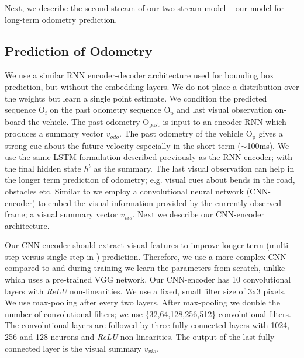 \iffalse
Thus, our predictive distribution factorizes over time-steps and the predictive distribution at time $t+n$ is conditioned upon the summary vector $v_{bbox}$ (thus $\text{B}_{\text{past}}$), the predicted odometry and the distribution at the previous time-step. \mario{you always talk about ``can'' in the previous paragraph. say what you do - otherwise it is perceived as optional}
\fi

Next, we describe the second stream of our two-stream model -- our model for long-term odometry prediction.

\subsection{Prediction of Odometry}\label{sec:odometry}
We use a similar RNN encoder-decoder architecture used for bounding box prediction, but without the embedding layers. We do not place a distribution over the weights but learn a single point estimate. We condition the predicted sequence $\text{O}_{\text{f}}$ on the past odometry sequence $\text{O}_{\text{p}}$ and last visual observation on-board the vehicle. The past odometry $\text{O}_{\text{past}}$ is input to an encoder RNN which produces a summary vector $v_{odo}$. The past odometry of the vehicle $\text{O}_{\text{p}}$ gives a strong cue about the future velocity especially in the short term ($\sim$100ms). We use the same LSTM formulation described previously as the RNN encoder; with the final hidden state $h^{t}$ as the summary. The last visual observation can help in the longer term prediction of odometry; e.g. visual cues about bends in the road, obstacles etc. Similar to \cite{xu2016end,bojarski2016end} we employ a convolutional neural network (CNN-encoder) to embed the visual information provided by the currently observed frame; a visual summary vector $v_{vis}$. Next we describe our CNN-encoder architecture.

Our CNN-encoder should extract visual features to improve longer-term (multi-step versus single-step in \cite{xu2016end,bojarski2016end}) prediction. Therefore, we use a more complex CNN compared to \cite{bojarski2016end} and during training we learn the parameters from scratch, unlike \cite{xu2016end} which uses a pre-trained VGG network. Our CNN-encoder has 10 convolutional layers with \emph{ReLU} non-linearities. We use a fixed, small filter size of 3x3 pixels. We use max-pooling after every two layers. After max-pooling we double the number of convolutional filters; we use \{32,64,128,256,512\} convolutional filters. The convolutional layers are followed by three fully connected layers with 1024, 256 and 128 neurons and \emph{ReLU} non-linearities. The output of the last fully connected layer is the visual summary $v_{vis}$.

